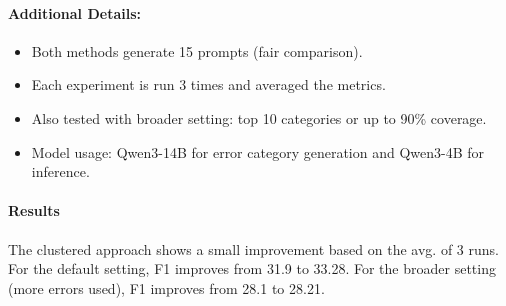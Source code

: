 \documentclass[12pt]{article}
\begin{document}
\paragraph{Additional Details:}
\begin{itemize}
    \item Both methods generate 15 prompts (fair comparison).
    \item Each experiment is run 3 times and averaged the metrics.
    \item Also tested with broader setting: top 10 categories or up to 90\% coverage.
    \item Model usage: Qwen3-14B for error category generation and Qwen3-4B for inference.
\end{itemize}

\paragraph{Results} The clustered approach shows a small improvement based on the avg. of 3 runs.
For the default setting, F1 improves from 31.9 to 33.28.
For the broader setting (more errors used), F1 improves from 28.1 to 28.21.

%   
%     
\end{document}
